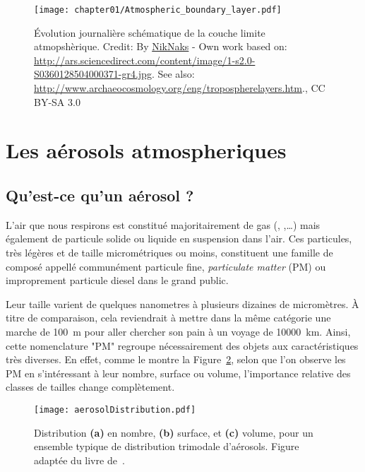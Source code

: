 \begin{figure}[h]
    \centering
    \texttt{[image: chapter01/Atmospheric\_boundary\_layer.pdf]}
    \caption{Évolution journalière schématique de la couche limite atmopshèrique.
        Credit: By
        \href{https://commons.wikimedia.org/w/index.php?curid=18862904}{NikNaks} - Own
        work based on:
        \url{http://ars.sciencedirect.com/content/image/1-s2.0-S0360128504000371-gr4.jpg}.
        See also: \url{http://www.archaeocosmology.org/eng/tropospherelayers.htm}., CC
        BY-SA 3.0
    }%
    \label{fig:chapter01/Atmospheric_boundary_layer}
\end{figure}

\section{Les aérosols atmospheriques}%
\label{sec:les_aerosols_atmosphereiques}

\subsection{Qu'est-ce qu'un aérosol ?}%
\label{sub:quest-ce-quun-aerosol}

L'air que nous respirons est constitué majoritairement de gas (, ,…) mais
également de particule solide ou liquide en suspension dans l'air. Ces particules, très
légères et de taille micrométriques ou moins, constituent une famille de composé appellé
communément particule fine, \textit{particulate matter} (PM) ou improprement particule
diesel dans le grand public.

Leur taille varient de quelques nanometres à plusieurs dizaines de micromètres.
À titre de comparaison, cela reviendrait à mettre dans la même catégorie une marche de
\SI{100}{m} pour aller chercher son pain à un voyage de \SI{10000}{km}.
Ainsi, cette nomenclature "PM" regroupe nécessairement des objets aux caractéristiques
très diverses. En effet, comme le montre la Figure~\ref{fig:aerosolDistribution}, selon
que l'on observe les PM en s'intéressant à leur nombre, surface ou volume, l'importance
relative des classes de tailles change complètement.
\begin{figure}[ht]
    \centering
    \texttt{[image: aerosolDistribution.pdf]}
    \caption{Distribution \textbf{(a)} en nombre, \textbf{(b)} surface, et
        \textbf{(c)} volume, pour un ensemble typique de distribution trimodale
        d'aérosols. Figure adaptée du livre de~\textcite{seinfieldAtmospheric1998}.}
    \label{fig:aerosolDistribution}
\end{figure}

